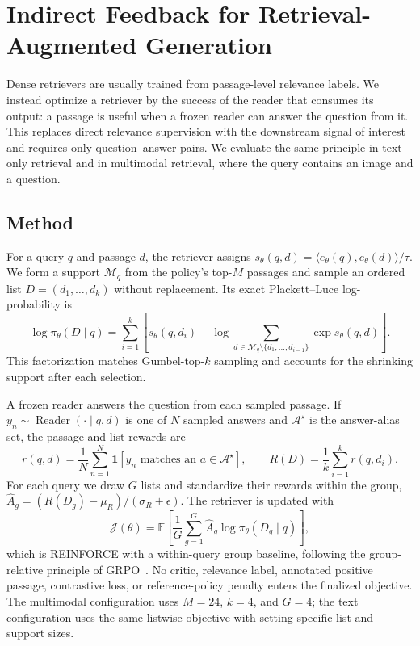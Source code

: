 \section{Indirect Feedback for Retrieval-Augmented Generation}
\label{sec:mm_rag}

Dense retrievers are usually trained from passage-level relevance labels. We instead optimize a
retriever by the success of the reader that consumes its output: a passage is useful when a frozen
reader can answer the question from it. This replaces direct relevance supervision with the
downstream signal of interest and requires only question--answer pairs. We evaluate the same
principle in text-only retrieval and in multimodal retrieval, where the query contains an image and
a question.

\subsection{Method}
\label{sec:rag_method}

For a query $q$ and passage $d$, the retriever assigns
$s_\theta(q,d)=\langle e_\theta(q),e_\theta(d)\rangle/\tau$. We form a support
$\mathcal{M}_q$ from the policy's top-$M$ passages and sample an ordered list
$D=(d_1,\ldots,d_k)$ without replacement. Its exact Plackett--Luce log-probability is
\begin{equation}
\log \pi_\theta(D\mid q)
=\sum_{i=1}^{k}\left[s_\theta(q,d_i)
-\log\!\sum_{d\in\mathcal{M}_q\setminus\{d_1,\ldots,d_{i-1}\}}
\exp s_\theta(q,d)\right].
\label{eq:pl}
\end{equation}
This factorization matches Gumbel-top-$k$ sampling and accounts for the shrinking support after each
selection.

A frozen reader answers the question from each sampled passage. If
$y_n\sim\operatorname{Reader}(\cdot\mid q,d)$ is one of $N$ sampled answers and
$\mathcal{A}^{\star}$ is the answer-alias set, the passage and list rewards are
\begin{equation}
r(q,d)=\frac{1}{N}\sum_{n=1}^{N}
\mathbf{1}\!\left[y_n\text{ matches an }a\in\mathcal{A}^{\star}\right],
\qquad
R(D)=\frac{1}{k}\sum_{i=1}^{k}r(q,d_i).
\label{eq:reward}
\end{equation}
For each query we draw $G$ lists and standardize their rewards within the group,
$\hat A_g=(R(D_g)-\mu_R)/(\sigma_R+\epsilon)$. The retriever is updated with
\begin{equation}
\mathcal{J}(\theta)=
\mathbb{E}\!\left[\frac{1}{G}\sum_{g=1}^{G}
\hat A_g\log\pi_\theta(D_g\mid q)\right],
\label{eq:rag_objective}
\end{equation}
which is REINFORCE with a within-query group baseline, following the group-relative principle of
GRPO~\citep{shao2024deepseekmath}. No critic, relevance label, annotated positive passage,
contrastive loss, or reference-policy penalty enters the finalized objective. The multimodal
configuration uses $M{=}24$, $k{=}4$, and $G{=}4$; the text configuration uses the same listwise
objective with setting-specific list and support sizes.


